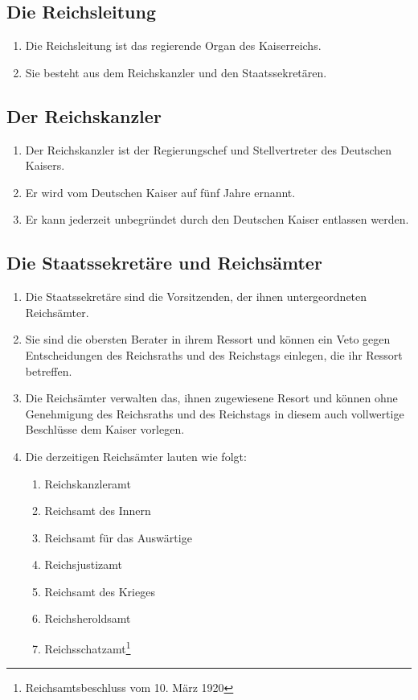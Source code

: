 \documentclass{article}
\begin{document}
\subsection{Die Reichsleitung}
\begin{enumerate}[(1)]
    \item Die Reichsleitung ist das regierende Organ des Kaiserreichs.
    \item Sie besteht aus dem Reichskanzler und den Staatssekretären.
\end{enumerate}

\subsection{Der Reichskanzler}
\begin{enumerate}[(1)]
    \item Der Reichskanzler ist der Regierungschef und Stellvertreter des Deutschen Kaisers.
    \item Er wird vom Deutschen Kaiser auf fünf Jahre ernannt.
    \item Er kann jederzeit unbegründet durch den Deutschen Kaiser entlassen werden.
\end{enumerate}

\subsection{Die Staatssekretäre und Reichsämter}
\begin{enumerate}[(1)]
    \item Die Staatssekretäre sind die Vorsitzenden, der ihnen untergeordneten Reichsämter.
    \item Sie sind die obersten Berater in ihrem Ressort und können ein Veto gegen Entscheidungen des Reichsraths und des Reichstags einlegen, die ihr Ressort betreffen.
    \item Die Reichsämter verwalten das, ihnen zugewiesene Resort und können ohne Genehmigung des Reichsraths und des Reichstags in diesem auch vollwertige Beschlüsse dem Kaiser vorlegen.
    \item Die derzeitigen Reichsämter lauten wie folgt:
    \begin{enumerate}[1.]
        \item Reichskanzleramt
        \item Reichsamt des Innern
        \item Reichsamt für das Auswärtige
        \item Reichsjustizamt
        \item Reichsamt des Krieges
        \item Reichsheroldsamt
        \item Reichsschatzamt\footnote{Reichsamtsbeschluss vom 10. März 1920}
    \end{enumerate}
\end{enumerate}
\end{document}
